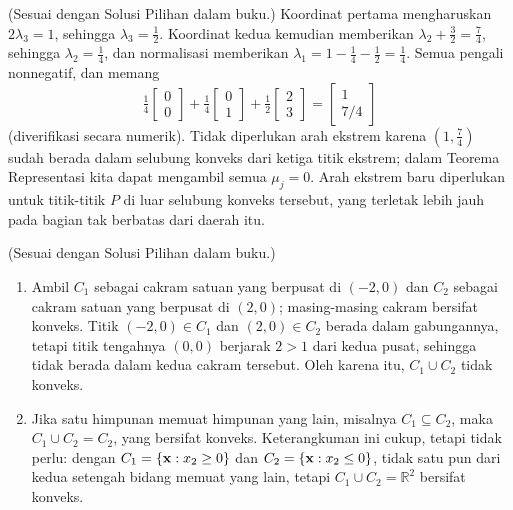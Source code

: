 (Sesuai dengan Solusi Pilihan dalam buku.) Koordinat pertama mengharuskan $2\lambda_3 = 1$, sehingga $\lambda_3 = \tfrac12$. Koordinat kedua kemudian memberikan $\lambda_2 + \tfrac32 = \tfrac74$, sehingga $\lambda_2 = \tfrac14$, dan normalisasi memberikan $\lambda_1 = 1 - \tfrac14 - \tfrac12 = \tfrac14$. Semua pengali nonnegatif, dan memang
\[
\tfrac14 \begin{bmatrix} 0 \\ 0 \end{bmatrix} + \tfrac14 \begin{bmatrix} 0 \\ 1 \end{bmatrix} + \tfrac12 \begin{bmatrix} 2 \\ 3 \end{bmatrix} = \begin{bmatrix} 1 \\ 7/4 \end{bmatrix}
\]
(diverifikasi secara numerik). Tidak diperlukan arah ekstrem karena $(1, \tfrac74)$ sudah berada dalam selubung konveks dari ketiga titik ekstrem; dalam Teorema Representasi kita dapat mengambil semua $\mu_j = 0$. Arah ekstrem baru diperlukan untuk titik-titik $P$ di luar selubung konveks tersebut, yang terletak lebih jauh pada bagian tak berbatas dari daerah itu.

(Sesuai dengan Solusi Pilihan dalam buku.)
\begin{enumerate}
\item Ambil $C_1$ sebagai cakram satuan yang berpusat di $(-2, 0)$ dan $C_2$ sebagai cakram satuan yang berpusat di $(2, 0)$; masing-masing cakram bersifat konveks. Titik $(-2, 0) \in C_1$ dan $(2, 0) \in C_2$ berada dalam gabungannya, tetapi titik tengahnya $(0,0)$ berjarak $2 > 1$ dari kedua pusat, sehingga tidak berada dalam kedua cakram tersebut. Oleh karena itu, $C_1 \cup C_2$ tidak konveks.
\item Jika satu himpunan memuat himpunan yang lain, misalnya $C_1 \subseteq C_2$, maka $C_1 \cup C_2 = C_2$, yang bersifat konveks. Keterangkuman ini cukup, tetapi tidak perlu: dengan $C_1 = \{\mathbf{x} : x_2 \geq 0\}$ dan $C_2 = \{\mathbf{x} : x_2 \leq 0\}$, tidak satu pun dari kedua setengah bidang memuat yang lain, tetapi $C_1 \cup C_2 = \mathbb{R}^2$ bersifat konveks.
\end{enumerate}


